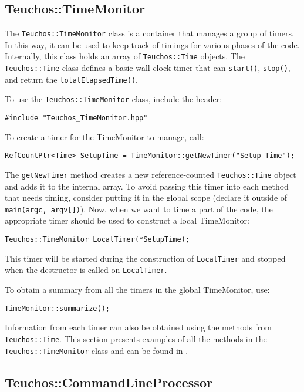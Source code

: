 
\subsection{Teuchos::TimeMonitor}
\label{sec:teuchos:TimeMonitor}

The \verb!Teuchos::TimeMonitor! class is a container that manages a
group of timers.  In this way, it can be used to keep track of timings
for various phases of the code.  Internally, this class holds an array 
of \verb!Teuchos::Time! objects.  The 
\verb!Teuchos::Time! class defines a basic wall-clock timer that can 
\verb!start()!, \verb!stop()!, and return the \verb!totalElapsedTime()!.

To use the \verb!Teuchos::TimeMonitor! class, include the header:
{\small 
\begin{verbatim}
#include "Teuchos_TimeMonitor.hpp"
\end{verbatim}}
To create a timer for the TimeMonitor to manage, call:
{\small 
\begin{verbatim}
RefCountPtr<Time> SetupTime = TimeMonitor::getNewTimer("Setup Time");
\end{verbatim}}
\noindent The {\tt getNewTimer} method creates a new reference-counted
{\tt Teuchos::Time} object and adds it to the internal array.  To avoid
passing this timer into each method that needs timing, consider putting it in the
global scope (declare it outside of {\tt main(argc, argv[])}).  Now, when 
we want to time a part of the code, the appropriate timer should be used to 
construct a local TimeMonitor:
{\small
\begin{verbatim}
Teuchos::TimeMonitor LocalTimer(*SetupTime);
\end{verbatim}}
\noindent This timer will be started during the construction of {\tt LocalTimer}
and stopped when the destructor is called on {\tt LocalTimer}.

To obtain a summary from all the timers in the global TimeMonitor, use:
{\small
\begin{verbatim}
TimeMonitor::summarize();
\end{verbatim}}
\noindent Information from each timer can also be obtained using 
the methods from {\tt Teuchos::Time}.  This section presents examples of all the 
methods in the {\tt Teuchos::TimeMonitor} class and can be found in
.  


\subsection{Teuchos::CommandLineProcessor}
\label{sec:teuchos:CLP}

